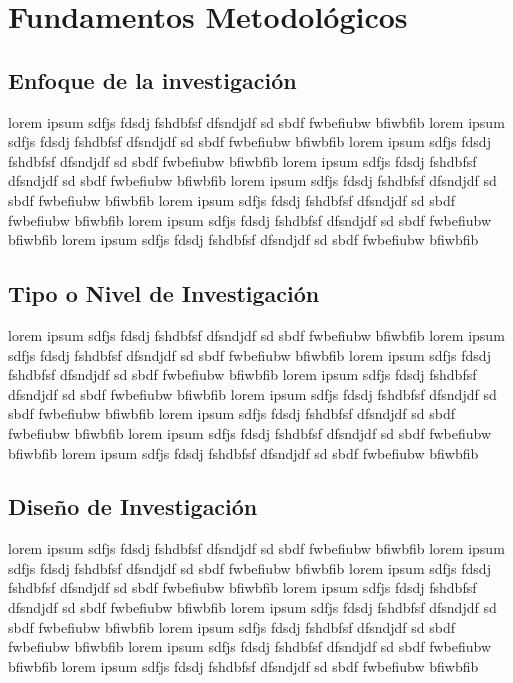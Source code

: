 \chapter{Fundamentos Metodol\'ogicos}

	
\section{Enfoque de la investigaci\'on}
	
	lorem ipsum sdfjs fdsdj fshdbfsf dfsndjdf sd sbdf fwbefiubw bfiwbfib lorem ipsum sdfjs fdsdj fshdbfsf dfsndjdf sd sbdf fwbefiubw bfiwbfib lorem ipsum sdfjs fdsdj fshdbfsf dfsndjdf sd sbdf fwbefiubw bfiwbfib lorem ipsum sdfjs fdsdj fshdbfsf dfsndjdf sd sbdf fwbefiubw bfiwbfib lorem ipsum sdfjs fdsdj fshdbfsf dfsndjdf sd sbdf fwbefiubw bfiwbfib lorem ipsum sdfjs fdsdj fshdbfsf dfsndjdf sd sbdf fwbefiubw bfiwbfib lorem ipsum sdfjs fdsdj fshdbfsf dfsndjdf sd sbdf fwbefiubw bfiwbfib lorem ipsum sdfjs fdsdj fshdbfsf dfsndjdf sd sbdf fwbefiubw bfiwbfib
	
\section{Tipo o Nivel de Investigaci\'on}

	lorem ipsum sdfjs fdsdj fshdbfsf dfsndjdf sd sbdf fwbefiubw bfiwbfib lorem ipsum sdfjs fdsdj fshdbfsf dfsndjdf sd sbdf fwbefiubw bfiwbfib lorem ipsum sdfjs fdsdj fshdbfsf dfsndjdf sd sbdf fwbefiubw bfiwbfib lorem ipsum sdfjs fdsdj fshdbfsf dfsndjdf sd sbdf fwbefiubw bfiwbfib lorem ipsum sdfjs fdsdj fshdbfsf dfsndjdf sd sbdf fwbefiubw bfiwbfib lorem ipsum sdfjs fdsdj fshdbfsf dfsndjdf sd sbdf fwbefiubw bfiwbfib lorem ipsum sdfjs fdsdj fshdbfsf dfsndjdf sd sbdf fwbefiubw bfiwbfib lorem ipsum sdfjs fdsdj fshdbfsf dfsndjdf sd sbdf fwbefiubw bfiwbfib	
	
\section{Dise\~no de Investigaci\'on}
	
	lorem ipsum sdfjs fdsdj fshdbfsf dfsndjdf sd sbdf fwbefiubw bfiwbfib lorem ipsum sdfjs fdsdj fshdbfsf dfsndjdf sd sbdf fwbefiubw bfiwbfib lorem ipsum sdfjs fdsdj fshdbfsf dfsndjdf sd sbdf fwbefiubw bfiwbfib lorem ipsum sdfjs fdsdj fshdbfsf dfsndjdf sd sbdf fwbefiubw bfiwbfib lorem ipsum sdfjs fdsdj fshdbfsf dfsndjdf sd sbdf fwbefiubw bfiwbfib lorem ipsum sdfjs fdsdj fshdbfsf dfsndjdf sd sbdf fwbefiubw bfiwbfib lorem ipsum sdfjs fdsdj fshdbfsf dfsndjdf sd sbdf fwbefiubw bfiwbfib lorem ipsum sdfjs fdsdj fshdbfsf dfsndjdf sd sbdf fwbefiubw bfiwbfib
	

